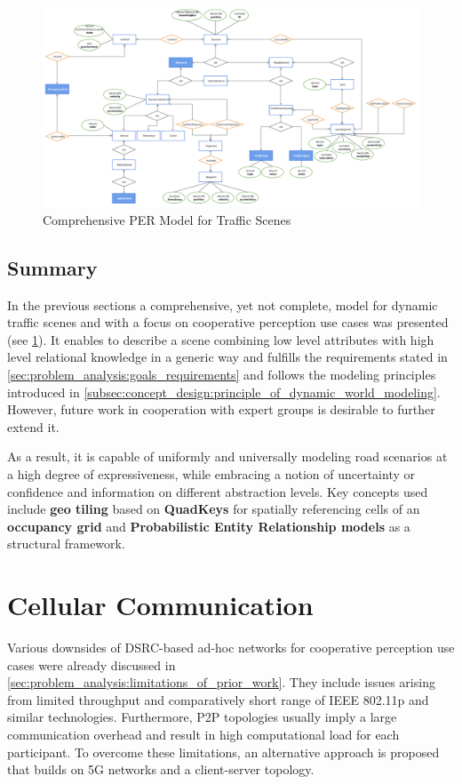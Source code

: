 \begin{figure}
	\centering
	\includegraphics[width=\linewidth]{98_images/scene_representation_er}
	\caption{Comprehensive PER Model for Traffic Scenes}
	\label{fig:final_model}
\end{figure}

\subsection{Summary}
\label{subsec:concept_design:modeling:summary}
In the previous sections a comprehensive, yet not complete, model for dynamic traffic scenes and with a focus on cooperative perception use cases was presented (see \cref{fig:final_model}). It enables to describe a scene combining low level attributes with high level relational knowledge in a generic way and fulfills the requirements stated in \cref{sec:problem_analysis:goals_requirements} and follows the modeling principles introduced in \cref{subsec:concept_design:principle_of_dynamic_world_modeling}. However, future work in cooperation with expert groups is desirable to further extend it.

As a result, it is capable of uniformly and universally modeling road scenarios at a high degree of expressiveness, while embracing a notion of uncertainty or confidence and information on different abstraction levels. Key concepts used include \textbf{geo tiling} based on \textbf{QuadKeys} for spatially referencing cells of an \textbf{occupancy grid} and \textbf{Probabilistic Entity Relationship models} as a structural framework.

\section{Cellular Communication}
\label{sec:concept_design:cellular_communication}
Various downsides of DSRC-based ad-hoc networks for cooperative perception use cases were already discussed in \cref{sec:problem_analysis:limitations_of_prior_work}. They include issues arising from limited throughput and comparatively short range of IEEE 802.11p and similar technologies. Furthermore, P2P topologies usually imply a large communication overhead and result in high computational load for each participant. To overcome these limitations, an alternative approach is proposed that builds on 5G networks and a client-server topology.

